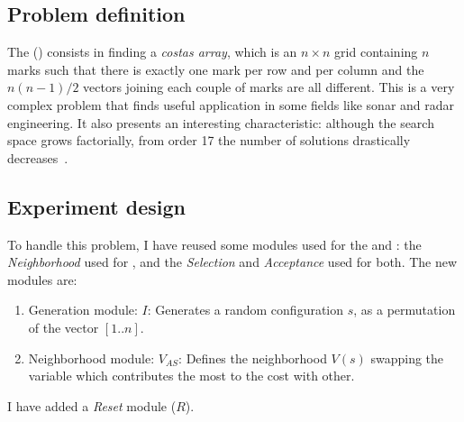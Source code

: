 
\subsection{Problem definition}

The \carrp{} (\CARRP) consists in finding a \textit{costas array}, which is an $n\times n$ grid containing $n$ marks such that there is exactly one mark per row and per column and the $n(n-1)/2$ vectors joining each couple of marks are all different. This is a very complex problem that finds useful application in some fields like sonar and radar engineering. It also presents an interesting characteristic: although the search space grows factorially, from order 17 the number of solutions drastically decreases~\cite{Drakakis2006}.


\subsection{Experiment design}

To handle this problem, I have reused some modules used for the \sgp{} and \nqp: the {\it Neighborhood} \om{} used for \nq{}, and the \textit{Selection} and \textit{Acceptance} \oms{} used for both. The new modules are: 

\begin{enumerate}
	\item Generation module:
	\subitem $I$: Generates a random configuration $s$, as a permutation of the vector $[1..n]$. 
	\item Neighborhood module:
	\subitem $V_{AS}$: Defines the neighborhood $V\left(s\right)$ swapping the variable which contributes the most to the cost with other.
\end{enumerate}

 I have added a {\it Reset} module ($R$).

